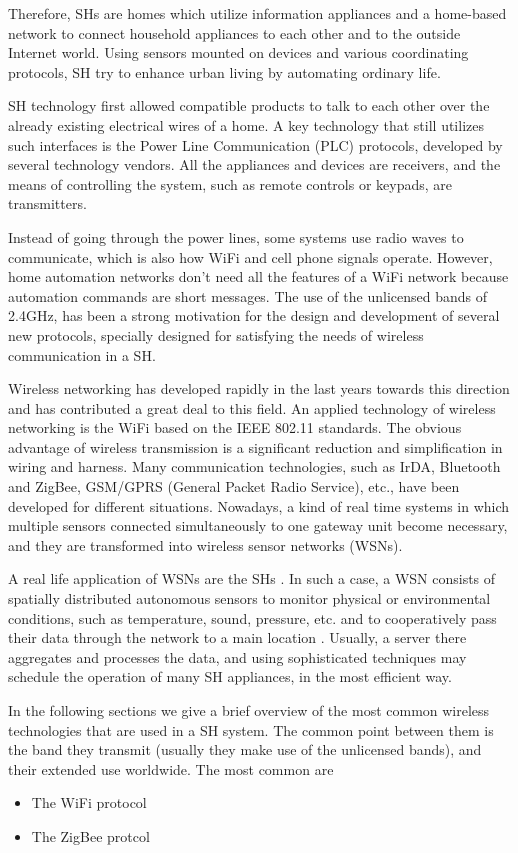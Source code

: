 \documentclass[conference]{IEEEtran}
\begin{document}
Therefore, SHs are homes which utilize information appliances and a home-based network to connect household appliances to each other and to the outside Internet world.
Using sensors mounted on devices and various coordinating protocols, SH try to enhance urban living by automating ordinary life. 

SH technology first allowed compatible products to talk to each other over the already existing electrical wires of a home. 
A key technology that still utilizes such interfaces is the Power Line Communication (PLC) protocols, developed by several technology vendors.
All the appliances and devices are receivers, and the means of controlling the system, such as remote controls or keypads, are transmitters. 

Instead of going through the power lines, some systems use radio waves to communicate, which is also how WiFi and cell phone signals operate. 
However, home automation networks don't need all the features of a WiFi network because automation commands are short messages. 
The use of the unlicensed bands of 2.4GHz, has been a strong motivation for the design and development of several new protocols, specially designed for satisfying the needs of wireless communication in a SH.

Wireless networking has developed rapidly in the last years towards this direction and has contributed a great deal to this field. 
An applied technology of wireless networking is the WiFi based on the IEEE 802.11 standards.
The obvious advantage of wireless transmission is a significant reduction and simplification in wiring and harness. 
Many communication technologies, such as IrDA, Bluetooth and ZigBee, GSM/GPRS (General Packet Radio Service), etc., have been developed for different situations. 
Nowadays, a kind of real time systems in which multiple sensors connected simultaneously to one gateway unit become necessary, and they are transformed into wireless sensor networks (WSNs).

A real life application of WSNs are the SHs \cite{paper}.  
In such a case, a WSN consists of spatially distributed autonomous sensors to monitor physical or environmental conditions, such as temperature, sound, pressure, etc. and to cooperatively pass their data through the network to a main location \cite{wikiwsn}.
Usually, a server there aggregates and processes the data, and using sophisticated techniques may schedule the operation of many SH appliances, in the most efficient way.

In the following sections we give a brief overview of the most common wireless technologies that are used in a SH system. 
The common point between them is the band they transmit (usually they make use of the unlicensed bands), and their extended use worldwide.
The most common are 
\begin{itemize}

  \item The WiFi protocol
  \item The ZigBee protcol


\end{itemize}
\end{document}
